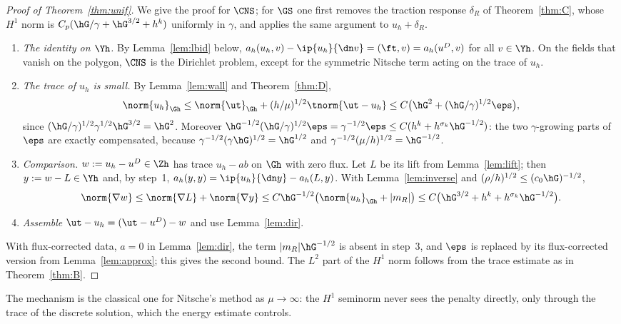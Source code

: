 \begin{proof}[Proof of Theorem~\ref{thm:unif}]
We give the proof for $\CNS$; for $\GS$ one first removes the traction response $\delta_R$ of Theorem~\ref{thm:C}, whose $H^1$ norm is $C_p(\hG/\gamma+\hG^{3/2}+h^k)$ uniformly in $\gamma$, and applies the same argument to $u_h+\delta_R$.
\begin{enumerate}
\item \emph{The identity on $\Yh$.} By Lemma~\ref{lem:lbid} below, $a_h(u_h,v)-\ip{u_h}{\dn v}=(\ft,v)=a_h(u^D,v)$ for all $v\in\Yh$. On the fields that vanish on the polygon, $\CNS$ is the Dirichlet problem, except for the symmetric Nitsche term acting on the trace of $u_h$.
\item \emph{The trace of $u_h$ is small.} By Lemma~\ref{lem:wall} and Theorem~\ref{thm:D},
\[
\norm{u_h}_{\Gh}\le\norm{\ut}_{\Gh}+(h/\mu)^{1/2}\tnorm{\ut-u_h}\le C\bigl(\hG^2+(\hG/\gamma)^{1/2}\eps\bigr),
\]
since $(\hG/\gamma)^{1/2}\gamma^{1/2}\hG^{3/2}=\hG^2$. Moreover $\hG^{-1/2}(\hG/\gamma)^{1/2}\eps=\gamma^{-1/2}\eps\le C(h^k+h^{\sigma_k}\hG^{-1/2})$: the two $\gamma$-growing parts of $\eps$ are exactly compensated, because $\gamma^{-1/2}(\gamma\hG)^{1/2}=\hG^{1/2}$ and $\gamma^{-1/2}(\mu/h)^{1/2}=\hG^{-1/2}$.
\item \emph{Comparison.} $w:=u_h-u^D\in\Zh$ has trace $u_h-ab$ on $\Gh$ with zero flux. Let $L$ be its lift from Lemma~\ref{lem:lift}; then $y:=w-L\in\Yh$ and, by step~1, $a_h(y,y)=\ip{u_h}{\dn y}-a_h(L,y)$. With Lemma~\ref{lem:inverse} and $(\rho/h)^{1/2}\le(c_0\hG)^{-1/2}$,
\[
\norm{\nabla w}\le\norm{\nabla L}+\norm{\nabla y}\le C\hG^{-1/2}\bigl(\norm{u_h}_{\Gh}+|m_R|\bigr)\le C\bigl(\hG^{3/2}+h^k+h^{\sigma_k}\hG^{-1/2}\bigr).
\]
\item \emph{Assemble} $\ut-u_h=(\ut-u^D)-w$ and use Lemma~\ref{lem:dir}.
\end{enumerate}
With flux-corrected data, $a=0$ in Lemma~\ref{lem:dir}, the term $|m_R|\hG^{-1/2}$ is absent in step~3, and $\eps$ is replaced by its flux-corrected version from Lemma~\ref{lem:approx}; this gives the second bound. The $L^2$ part of the $H^1$ norm follows from the trace estimate as in Theorem~\ref{thm:B}.
\end{proof}

The mechanism is the classical one for Nitsche's method as $\mu\to\infty$: the $H^1$ seminorm never sees the penalty directly, only through the trace of the discrete solution, which the energy estimate controls.

